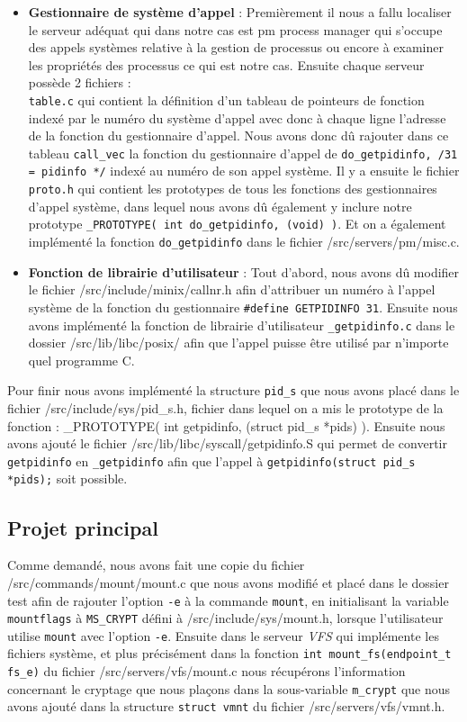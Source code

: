 \documentclass[10pt, onecolumn] {IEEEtran}
\begin{document}
\begin{itemize}
\item \textbf{Gestionnaire de système d'appel} : Premièrement il nous a fallu localiser le serveur adéquat qui dans notre cas est pm \og process manager \fg qui s'occupe des appels systèmes relative à la gestion de processus ou encore à examiner les propriétés des processus ce qui est notre cas. Ensuite chaque serveur possède 2 fichiers : \\ \texttt{table.c} qui contient la définition d'un tableau de pointeurs de fonction indexé par le numéro du système d'appel avec donc à chaque ligne l'adresse de la fonction du gestionnaire d'appel. Nous avons donc dû rajouter dans ce tableau \texttt{call\_vec} la fonction du gestionnaire d'appel de \texttt{do\_getpidinfo,	\slash* 31 = pidinfo	*\slash} indexé au numéro de son appel système. Il y a ensuite le fichier  \texttt{proto.h} qui contient les prototypes de tous les fonctions des gestionnaires d'appel système, dans lequel nous avons dû également y inclure notre prototype \texttt{\_PROTOTYPE( int do\_getpidinfo, (void)					)}. Et on a également implémenté la fonction  \texttt{do\_getpidinfo} dans le fichier /src/servers/pm/misc.c.

\item \textbf{Fonction de librairie d'utilisateur} : Tout d'abord, nous avons dû modifier le fichier /src/include/minix/callnr.h afin d'attribuer un numéro à l'appel système de la fonction du gestionnaire \texttt{\#define GETPIDINFO 31}. Ensuite nous avons implémenté la fonction de librairie d'utilisateur \texttt{\_getpidinfo.c} dans le dossier /src/lib/libc/posix/ afin que l'appel puisse être utilisé par n'importe quel programme C.  \\
\end{itemize}

Pour finir nous avons implémenté la structure \texttt{pid\_s} que nous avons placé dans le fichier /src/include/sys/pid\_s.h, fichier dans lequel on a mis le prototype de la fonction : \_PROTOTYPE( int getpidinfo, (struct pid\_s *pids)            ). Ensuite nous avons ajouté le fichier /src/lib/libc/syscall/getpidinfo.S qui permet de convertir \texttt{getpidinfo} en  \texttt{\_getpidinfo} afin que l'appel à \texttt{getpidinfo(struct pid\_s *pids);} soit possible. 

\subsection{Projet principal}

Comme demandé, nous avons fait une copie du fichier /src/commands/mount/mount.c que nous avons modifié et placé dans le dossier test afin de rajouter l'option \texttt{-e} à la commande \texttt{mount}, en initialisant la variable \texttt{mountflags} à \texttt{MS\_CRYPT} défini à /src/include/sys/mount.h, lorsque l'utilisateur utilise \texttt{mount} avec l'option \texttt{-e}. Ensuite dans le serveur \textit{VFS} qui implémente les fichiers système, et plus précisément dans la fonction \texttt{int mount\_fs(endpoint\_t fs\_e)} du fichier /src/servers/vfs/mount.c nous récupérons l'information concernant le cryptage que nous plaçons dans la sous-variable \texttt{m\_crypt} que nous avons ajouté dans la structure \texttt{struct vmnt} du fichier /src/servers/vfs/vmnt.h.    
\end{document}
